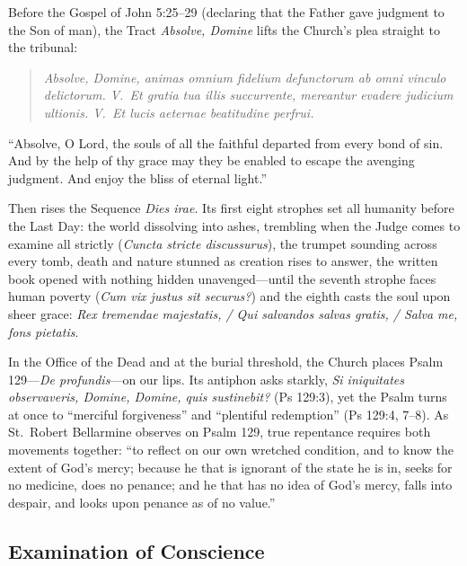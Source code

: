 Before the Gospel of John 5:25--29 (declaring that the Father gave judgment to the Son of man), the Tract \textit{Absolve, Domine} lifts the Church's plea straight to the tribunal:

\begin{quote}
\textit{Absolve, Domine, animas omnium fidelium defunctorum ab omni vinculo delictorum. V.\ Et gratia tua illis succurrente, mereantur evadere judicium ultionis. V.\ Et lucis aeternae beatitudine perfrui.}
\end{quote}

``Absolve, O Lord, the souls of all the faithful departed from every bond of sin. And by the help of thy grace may they be enabled to escape the avenging judgment. And enjoy the bliss of eternal light.''

Then rises the Sequence \textit{Dies irae}. Its first eight strophes set all humanity before the Last Day: the world dissolving into ashes, trembling when the Judge comes to examine all strictly (\textit{Cuncta stricte discussurus}), the trumpet sounding across every tomb, death and nature stunned as creation rises to answer, the written book opened with nothing hidden unavenged---until the seventh strophe faces human poverty (\textit{Cum vix justus sit securus?}) and the eighth casts the soul upon sheer grace: \textit{Rex tremendae majestatis, / Qui salvandos salvas gratis, / Salva me, fons pietatis}.

In the Office of the Dead and at the burial threshold, the Church places Psalm 129---\textit{De profundis}---on our lips. Its antiphon asks starkly, \textit{Si iniquitates observaveris, Domine, Domine, quis sustinebit?} (Ps 129:3), yet the Psalm turns at once to ``merciful forgiveness'' and ``plentiful redemption'' (Ps 129:4, 7--8). As St.\ Robert Bellarmine observes on Psalm 129, true repentance requires both movements together: ``to reflect on our own wretched condition, and to know the extent of God's mercy; because he that is ignorant of the state he is in, seeks for no medicine, does no penance; and he that has no idea of God's mercy, falls into despair, and looks upon penance as of no value.''

\subsection*{Examination of Conscience}

